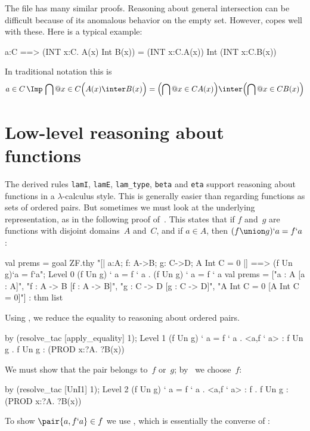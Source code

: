 The file  has many similar proofs.
Reasoning about general intersection can be difficult because of its anomalous
behavior on the empty set.  However,  copes well with
these.  Here is a typical example:
\begin{ttbox}
a:C ==> (INT x:C. A(x) Int B(x)) = (INT x:C.A(x)) Int (INT x:C.B(x))
\end{ttbox}
In traditional notation this is
\[ a\in C \,\Imp\, \bigcap@{x\in C} \Bigl(A(x) \inter B(x)\Bigr) =        
       \Bigl(\bigcap@{x\in C} A(x)\Bigr)  \inter  
       \Bigl(\bigcap@{x\in C} B(x)\Bigr)  \]

\section{Low-level reasoning about functions}
The derived rules {\tt lamI}, {\tt lamE}, {\tt lam_type}, {\tt beta}
and {\tt eta} support reasoning about functions in a
$\lambda$-calculus style.  This is generally easier than regarding
functions as sets of ordered pairs.  But sometimes we must look at the
underlying representation, as in the following proof
of~.  This states that if $f$ and~$g$ are
functions with disjoint domains~$A$ and~$C$, and if $a\in A$, then
$(f\union g)`a = f`a$:
\begin{ttbox}
val prems = goal ZF.thy
    "[| a:A;  f: A->B;  g: C->D;  A Int C = 0 |] ==>  \ttback
\ttback    (f Un g)`a = f`a";
{\out Level 0}
{\out (f Un g) ` a = f ` a}
{. (f Un g) ` a = f ` a}
\ttbreak
{\out val prems = ["a : A  [a : A]",}
{\out              "f : A -> B  [f : A -> B]",}
{\out              "g : C -> D  [g : C -> D]",}
{\out              "A Int C = 0  [A Int C = 0]"] : thm list}
\end{ttbox}
Using , we reduce the equality to reasoning about
ordered pairs.
\begin{ttbox}
by (resolve_tac [apply_equality] 1);
{\out Level 1}
{\out (f Un g) ` a = f ` a}
{. <a,f ` a> : f Un g}
{. f Un g : (PROD x:?A. ?B(x))}
\end{ttbox}
We must show that the pair belongs to~$f$ or~$g$; by~ we
choose~$f$:
\begin{ttbox}
by (resolve_tac [UnI1] 1);
{\out Level 2}
{\out (f Un g) ` a = f ` a}
{. <a,f ` a> : f}
{. f Un g : (PROD x:?A. ?B(x))}
\end{ttbox}
To show $\pair{a,f`a}\in f$ we use , which is
essentially the converse of :
